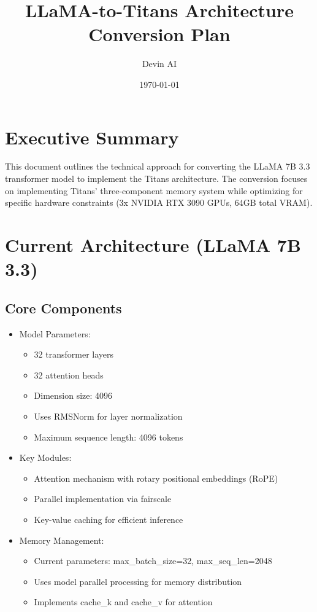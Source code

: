 \documentclass{article}
\title{LLaMA-to-Titans Architecture Conversion Plan}
\author{Devin AI}
\date{\today}
\begin{document}
\maketitle

\section{Executive Summary}
This document outlines the technical approach for converting the LLaMA 7B 3.3 transformer model to implement the Titans architecture. The conversion focuses on implementing Titans' three-component memory system while optimizing for specific hardware constraints (3x NVIDIA RTX 3090 GPUs, 64GB total VRAM).

\section{Current Architecture (LLaMA 7B 3.3)}
\subsection{Core Components}
\begin{itemize}
    \item Model Parameters:
    \begin{itemize}
        \item 32 transformer layers
        \item 32 attention heads
        \item Dimension size: 4096
        \item Uses RMSNorm for layer normalization
        \item Maximum sequence length: 4096 tokens
    \end{itemize}
    \item Key Modules:
    \begin{itemize}
        \item Attention mechanism with rotary positional embeddings (RoPE)
        \item Parallel implementation via fairscale
        \item Key-value caching for efficient inference
    \end{itemize}
    \item Memory Management:
    \begin{itemize}
        \item Current parameters: max\_batch\_size=32, max\_seq\_len=2048
        \item Uses model parallel processing for memory distribution
        \item Implements cache\_k and cache\_v for attention
    \end{itemize}
\end{itemize}
\end{document}
